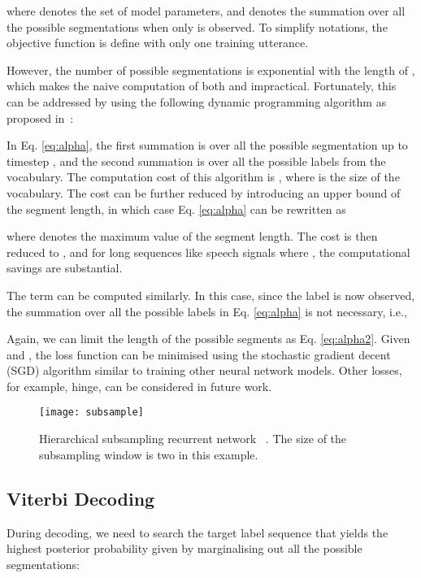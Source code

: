 \documentclass[a4paper]{article}
\begin{document}
where  denotes the set of model parameters, and  denotes the summation over all the possible segmentations when only  is observed. To simplify notations, the objective function  is define with only one training utterance. 

However, the number of possible segmentations is exponential with the length of , which makes the naive computation of both  and  impractical. Fortunately, this can be addressed by using the following dynamic programming algorithm as proposed in~\cite{sarawagi2004semi}:

In Eq. \eqref{eq:alpha}, the first summation is over all the possible segmentation up to timestep , and the second summation is over all the possible labels from the vocabulary. The computation cost of this algorithm is , where  is the size of the vocabulary. The cost can be further reduced by introducing an upper bound of  the segment length, in which case Eq. \eqref{eq:alpha} can be rewritten as

where  denotes the maximum value of the segment length. The cost is then reduced to , and for long sequences like speech signals where , the computational savings are substantial. 

The term  can be computed similarly. In this case, since the label  is now observed, the summation over all the possible labels  in Eq. \eqref{eq:alpha} is not necessary, i.e.,

Again, we can limit the length of the possible segments as Eq. \eqref{eq:alpha2}. Given  and , the loss function  can be minimised using the stochastic gradient decent (SGD) algorithm similar to training other neural network models. Other losses, for example, hinge, can be considered in future work.

\begin{figure}[t]
\small
\centerline{\texttt{[image: subsample]}} \vskip -4mm
\caption{ Hierarchical subsampling recurrent network~\cite{graves2012hierarchical} . The size of the subsampling window is two in this example.  }  
\label{fig:hsrnn}
\vskip -5mm
\end{figure}

\subsection{Viterbi Decoding}

During decoding, we need to search the target label sequence  that yields the highest posterior probability given  by marginalising out all the possible segmentations:
\end{document}
